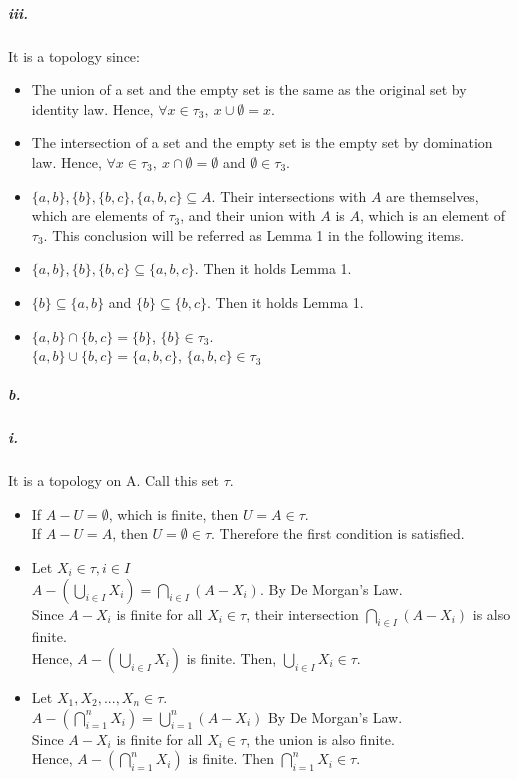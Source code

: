 \documentclass[11pt]{article}
\begin{document}
    \subparagraph{iii.}
    It is a topology since:
    \begin{itemize}
    \item The union of a set and the empty set is the same as the original set by identity law. Hence, $\forall x \in \tau_3,\ x\cup \emptyset = x$.
    \item The intersection of a set and the empty set is the empty set by domination law. Hence, $\forall x \in \tau_3, \ x \cap \emptyset = \emptyset$ and $\emptyset \in \tau_3$.
    \item $\{a,b\},\{b\},\{b,c\},\{a,b,c\} \subseteq A$. Their intersections with $A$ are themselves, which are elements of $\tau_3$, and their union with $A$ is $A$, which is an element of $\tau_3$. This conclusion will be referred as Lemma 1 in the following items.
    \item $\{a,b\},\{b\},\{b,c\} \subseteq \{a,b,c\}.$ Then it holds Lemma 1.
    \item $\{b\} \subseteq \{a,b\}$ and  $\{b\} \subseteq \{b,c\}$. Then it holds Lemma 1. %
    \item $\{a,b\} \cap \{b,c\} = \{b\}$, $\{b\} \in \tau_3$.\\
    $\{a,b\} \cup \{b,c\} = \{a,b,c\}$, $\{a,b,c\} \in \tau_3$
    \end{itemize}
\subparagraph{b.}
    \subparagraph{i.}
    It is a topology on A. Call this set $\tau$.
    \begin{itemize}
        \item If $A-U = \emptyset$, which is finite, then $U = A \in \tau$.\\
        If $A-U=A$, then $U=\emptyset \in \tau$. Therefore the first condition is satisfied.
        \item Let $X_i \in \tau, i \in I$\\
        $A-(\bigcup_{i \in I}X_i) = \bigcap_{i \in I} (A-X_i)$.   By De Morgan's Law.\\
        Since $A-X_i$ is finite for all $X_i \in \tau$, their intersection $\bigcap_{i \in I} (A-X_i)$ is also finite.\\
        Hence, $A-(\bigcup_{i \in I}X_i)$ is finite. Then, $\bigcup_{i \in I}X_i \in \tau$.
        \item Let $X_1, X_2, ... ,X_n \in \tau$.\\
        $A-(\bigcap_{i=1}^n X_i) = \bigcup_{i=1}^n (A-X_i)$ By De Morgan's Law.\\
        Since $A-X_i$ is finite for all $X_i \in \tau$, the union is also finite.\\
        Hence, $A-(\bigcap_{i=1}^n X_i)$ is finite. Then $\bigcap_{i=1}^n X_i \in \tau$.
    \end{itemize}  
    
\end{document}
